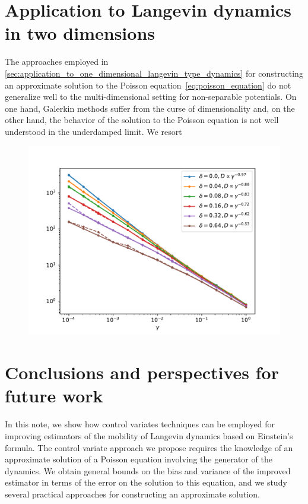 \documentclass[11pt,a4paper]{article}
\theoremstyle{plain}
\numberwithin{equation}{section}
\begin{document}
\section{Application to Langevin dynamics in two dimensions}%
\label{sec:applications_2d}%
The approaches employed in \cref{sec:application_to_one_dimensional_langevin_type_dynamics} for constructing an approximate solution to the Poisson equation~\eqref{eq:poisson_equation}
do not generalize well to the multi-dimensional setting for non-separable potentials.
On one hand, Galerkin methods suffer from the curse of dimensionality and,
on the other hand, the behavior of the solution to the Poisson equation is not well understood in the underdamped limit.
We resort
\begin{figure}[ht]
    \centering
    \includegraphics[width=0.99\linewidth]{figures/diffusion.pdf}
    \caption{
    }%
    \label{fig:time_bias_variance}
\end{figure}

\section{Conclusions and perspectives for future work}%
\label{sec:conclusions_and_perspectives_for_future_work}
In this note,
we show how control variates techniques can be employed for improving estimators of the mobility of Langevin dynamics based on Einstein's formula.
The control variate approach we propose requires the knowledge of an approximate solution of a Poisson equation involving the generator of the dynamics.
We obtain general bounds on the bias and variance of the improved estimator in terms of the error on the solution to this equation,
and we study several practical approaches for constructing an approximate solution.
\end{document}
